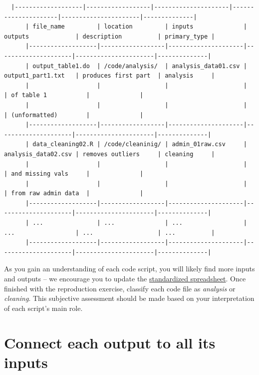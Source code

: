\documentclass[]{book}
\begin{document}
\begin{verbatim}
  |-------------------|------------------|---------------------|---------------------|----------------------|--------------|
      | file_name         | location         | inputs              | outputs             | description          | primary_type |
      |-------------------|------------------|---------------------|---------------------|----------------------|--------------|
      | output_table1.do  | /code/analysis/  | analysis_data01.csv | output1_part1.txt   | produces first part  | analysis     |
      |                   |                  |                     |                     | of table 1           |              |
      |                   |                  |                     |                     | (unformatted)        |              |
      |-------------------|------------------|---------------------|---------------------|----------------------|--------------|
      | data_cleaning02.R | /code/cleaninig/ | admin_01raw.csv     | analysis_data02.csv | removes outliers     | cleaning     |
      |                   |                  |                     |                     | and missing vals     |              |
      |                   |                  |                     |                     | from raw admin data  |              |
      |-------------------|------------------|---------------------|---------------------|----------------------|--------------|
      | ...               | ...              | ...                 | ...                 | ...                  | ...          |
      |-------------------|------------------|---------------------|---------------------|----------------------|--------------|
\end{verbatim}

As you gain an understanding of each code script, you will likely find more inputs and outputs -- we encourage you to update the \href{https://docs.google.com/spreadsheets/d/1LUIdVFH0OfR70C7z07TYeE-uWzKI_JIeWUMaYhqEKK0/edit\#gid=1617799822\&range=A1}{standardized spreadsheet}. Once finished with the reproduction exercise, classify each code file as \emph{analysis} or \emph{cleaning}. This subjective assessment should be made based on your interpretation of each script's main role.

\hypertarget{diagram}{%
\section{Connect each output to all its inputs}\label{diagram}}
\end{document}
